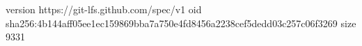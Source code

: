 version https://git-lfs.github.com/spec/v1
oid sha256:4b144aff05ee1ec159869bba7a750e4fd8456a2238cef5dedd03c257c06f3269
size 9331
